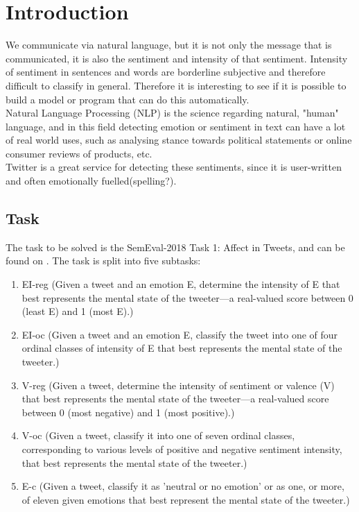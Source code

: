 \section{Introduction}
We communicate via natural language, but it is not only the message that is communicated, it is also the sentiment and intensity of that sentiment. Intensity of sentiment in sentences and words are borderline subjective and therefore difficult to classify in general. Therefore it is interesting to see if it is possible to build a model or program that can do this automatically. \\
Natural Language Processing (NLP) is the science regarding natural, "human" language, and in this field detecting emotion or sentiment in text can have a lot of real world uses, such as analysing stance towards political statements or online consumer reviews of products, etc. \\
Twitter is a great service for detecting these sentiments, since it is user-written and often emotionally fuelled(spelling?).
\subsection{Task} \label{sec:task}
The task to be solved is the SemEval-2018 Task 1: Affect in Tweets, and can be found on \cite{codalab}. The task is split into five subtasks:\\
\begin{enumerate}
\item EI-reg (Given a tweet and an emotion E, determine the  intensity of E that best represents the mental state of the tweeter—a real-valued score between 0 (least E) and 1 (most E).)
\item EI-oc (Given a tweet and an emotion E, classify the tweet into one of four ordinal classes of intensity of E that best represents the mental state of the tweeter.)
\item V-reg (Given a tweet, determine the intensity of sentiment or valence (V) that best represents the mental state of the tweeter—a real-valued score between 0 (most negative) and 1 (most positive).)
\item V-oc (Given a tweet, classify it into one of seven ordinal classes, corresponding to various levels of positive and negative sentiment intensity, that best represents the mental state of the tweeter.)
\item E-c (Given a tweet, classify it as 'neutral or no emotion' or as one, or more, of eleven given emotions that best represent the mental state of the tweeter.)
\end{enumerate}
 
